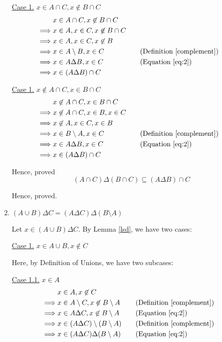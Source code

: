 \begin{enumerate}
\begin{named}[Part 2]
			\underline{Case 1.} $x \in A \cap C, x \not\in B \cap C$
			\begin{align*}
				& x \in A \cap C, x \not\in B \cap C \\
				\implies & x \in A, x \in C, x \not\in B \cap C \\
				\implies & x \in A, x \in C, x \not\in B \\
				\implies & x \in A \setminus B, x \in C 
					&& \quad \text{(Definition \ref{complement})} \\
				\implies & x \in A \Delta B, x \in C 
					&& \quad \text{(Equation \ref{eq:2})} \\
				\implies & x \in (A \Delta B) \cap C
			\end{align*}

			\underline{Case 1.} $x \not\in A \cap C, x \in B \cap C$
			\begin{align*}
				& x \not\in A \cap C, x \in B \cap C \\
				\implies & x \not\in A \cap C, x \in B, x \in C \\
				\implies & x \not\in A, x \in C, x \in B \\
				\implies & x \in B \setminus A, x \in C 
					&& \quad \text{(Definition \ref{complement})} \\
				\implies & x \in A \Delta B, x \in C 
					&& \quad \text{(Equation \ref{eq:2})} \\
				\implies & x \in (A \Delta B) \cap C
			\end{align*}

			Hence, proved $$(A \cap C) \Delta (B \cap C) \subseteq (A \Delta B) \cap C$$
		\end{named}
		Hence, proved.
		\es


	\item $(A \cup B) \Delta C = (A \Delta C) \Delta (B \setminus A)$
		\bs
		\begin{named}[Part 1]
			Let $x \in (A \cup B) \Delta C$. By Lemma \ref{lsd}, we have two cases:

			\underline{Case 1.} $x \in A \cup B, x \not\in C$

			Here, by Definition of Unions, we have two subcases:

			\underline{Case 1.1.} $x \in A$
			\begin{align*}
				& x \in A, x \not\in C \\
				\implies & x \in A \setminus C, x \not\in B \setminus A 
					&& \quad \text{(Definition \ref{complement})} \\
				\implies & x \in A \Delta C, x \not\in B \setminus A
					&& \quad \text{(Equation \ref{eq:2})} \\
				\implies & x \in (A \Delta C) \setminus (B \setminus A)
								 && \quad \text{(Definition \ref{complement})} \\
				\implies & x \in (A \Delta C) \Delta (B \setminus A) 
					&& \quad \text{(Equation \ref{eq:2})}
			\end{align*}


\end{named}
\end{enumerate}
